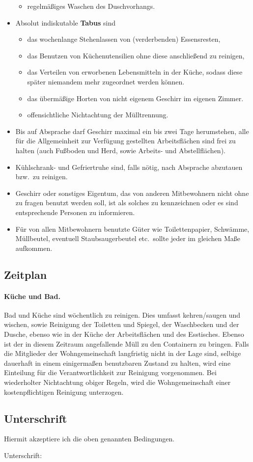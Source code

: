 \documentclass{article}
\begin{document}
\begin{itemize}
\begin{itemize}
            \item regelmäßiges Waschen des Duschvorhangs.
    \end{itemize}
        \item Absolut indiskutable \textbf{Tabus} sind
    \begin{itemize}
            \item das wochenlange Stehenlassen von (verderbenden) Essensresten,
            \item das Benutzen von Küchenutensilien ohne diese anschließend zu reinigen,
            \item das Verteilen von erworbenen Lebensmitteln in der Küche, sodass diese später niemandem mehr zugeordnet werden können.
            \item das übermäßige Horten von nicht eigenem Geschirr im eigenen Zimmer.
            \item offensichtliche Nichtachtung der Mülltrennung.
    \end{itemize}
        \item Bis auf Absprache darf Geschirr maximal ein bis zwei Tage herumstehen, alle für die Allgemeinheit zur Verfügung gestellten Arbeitsflächen sind frei zu halten (auch Fußboden und Herd, sowie Arbeits- und Abstellflächen).
        \item Kühlschrank- und Gefriertruhe sind, falls nötig, nach Absprache abzutauen bzw.\ zu reinigen.
        \item Geschirr oder sonstiges Eigentum, das von anderen Mitbewohnern nicht ohne zu fragen benutzt werden soll, ist als solches zu kennzeichnen oder es sind entsprechende Personen zu informieren.
        \item Für von allen Mitbewohnern benutzte Güter wie Toilettenpapier, Schwämme, Müllbeutel, eventuell Staubsaugerbeutel etc.\ sollte jeder im gleichen Maße aufkommen.
\end{itemize}

\subsection*{Zeitplan}

\paragraph{Küche und Bad.} Bad und Küche sind wöchentlich zu reinigen. Dies umfasst kehren/saugen und wischen, sowie Reinigung der Toiletten und Spiegel, der Waschbecken und der Dusche, ebenso wie in der Küche der Arbeitsflächen und des Esstisches.
Ebenso ist der in diesem Zeitraum angefallende Müll zu den Containern zu bringen.
Falls die Mitglieder der Wohngemeinschaft langfristig nicht in der Lage sind, selbige dauerhaft in einem einigermaßen benutzbaren Zustand zu halten, wird eine Einteilung für die Verantwortlichkeit zur Reinigung vorgenommen.
Bei wiederholter Nichtachtung obiger Regeln, wird die Wohngemeinschaft einer kostenpflichtigen Reinigung unterzogen.

\subsection*{Unterschrift}
Hiermit akzeptiere ich die oben genannten Bedingungen.

Unterschrift:
\end{document}
